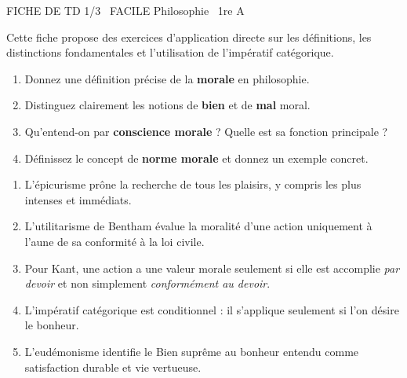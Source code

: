 \documentclass[11pt]{article}
\begin{document}
\begin{tcolorbox}[enhanced,colback=popink,colframe=popink,arc=10pt,boxrule=0pt,left=12pt,right=12pt,top=9pt,bottom=9pt]
{\color{white}\popxbold\small FICHE DE TD 1/3 \textbullet\ FACILE \hfill Philosophie \textbullet\ 1re A\par}
\end{tcolorbox}
\vspace{4pt}
Cette fiche propose des exercices d'application directe sur les définitions, les distinctions fondamentales et l'utilisation de l'impératif catégorique.

\begin{exercice}
\begin{enumerate}
    \item Donnez une définition précise de la \textbf{morale} en philosophie.
    \item Distinguez clairement les notions de \textbf{bien} et de \textbf{mal} moral.
    \item Qu'entend-on par \textbf{conscience morale} ? Quelle est sa fonction principale ?
    \item Définissez le concept de \textbf{norme morale} et donnez un exemple concret.
\end{enumerate}
\end{exercice}

\begin{exercice}
\begin{enumerate}
    \item L'épicurisme prône la recherche de tous les plaisirs, y compris les plus intenses et immédiats.
    \item L'utilitarisme de Bentham évalue la moralité d'une action uniquement à l'aune de sa conformité à la loi civile.
    \item Pour Kant, une action a une valeur morale seulement si elle est accomplie \textit{par devoir} et non simplement \textit{conformément au devoir}.
    \item L'impératif catégorique est conditionnel : il s'applique seulement si l'on désire le bonheur.
    \item L'eudémonisme identifie le Bien suprême au bonheur entendu comme satisfaction durable et vie vertueuse.
\end{enumerate}
\end{exercice}
\end{document}

